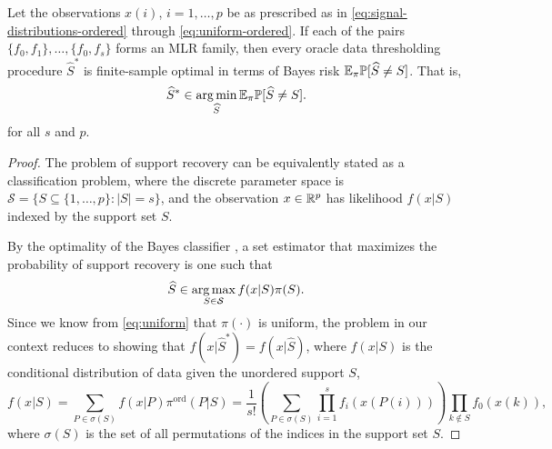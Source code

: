 \begin{theorem} \label{thm:optimal-oracle-procedures}
Let the observations $x(i)$, $i=1,\ldots,p$ be as prescribed as in \eqref{eq:signal-distributions-ordered} through \eqref{eq:uniform-ordered}.
If each of the pairs $\{f_0, f_{1}\},\ldots,\{f_0,f_{s}\}$ forms an MLR family, then every oracle data thresholding procedure $\widehat{S}^*$ is finite-sample optimal in terms of Bayes risk ${\mathbb E}_\pi {\mathbb P}[\widehat{S} \neq S]$. That is,
\begin{equation} \label{eq:finite-sample-Bayes-optimal}
    \widehat{S}^* \in \operatorname*{arg\,min}_{\widehat{S}} {\mathbb E}_\pi {\mathbb P}[\widehat{S} \neq S].
\end{equation}
for all $s$ and $p$.
\end{theorem} 
\begin{proof}%
The problem of support recovery can be equivalently stated as a classification problem, where the discrete parameter space is $\mathcal{S} = \{S\subseteq\{1,\ldots,p\}:|S|=s\}$, and the observation $x \in\mathbb R^p$ has likelihood $f(x|S)$ indexed by the support set $S$.

By the optimality of the Bayes classifier \citep[see, e.g.,][]{domingos1997optimality}, a set estimator that maximizes the probability of support recovery is one such that
$$
\widehat{S} \in \operatorname*{arg\,max}_{S\in \mathcal{S}} f(x|S) \pi(S).
$$
Since we know from \eqref{eq:uniform} that $\pi(\cdot)$ is uniform, the problem in our context reduces to showing that $f(x|\widehat{S}^*) = f(x|\widehat{S})$, where $f(x|S)$ is the conditional distribution of data given the unordered support $S$,
$$
f(x|S) 
= \sum_{P\in\sigma(S)} f(x|P) \pi^{\text{ord}}(P|S) 
= \frac{1}{s!} \left(\sum_{P\in\sigma{(S)}} \prod_{i=1}^s {f_{i}(x(P(i)))}\right) \prod_{k\not\in S}{f_0(x(k))},
$$
where $\sigma(S)$ is the set of all permutations of the indices in the support set $S$.


\end{proof}
